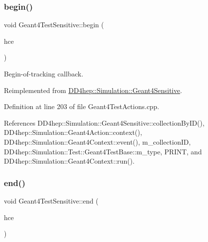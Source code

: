 \subsubsection{\texorpdfstring{begin()}{begin()}}
{\footnotesize\ttfamily void Geant4\+Test\+Sensitive\+::begin (\begin{DoxyParamCaption}\item[{G4\+H\+Cof\+This\+Event $\ast$}]{hce }\end{DoxyParamCaption})\hspace{0.3cm}{\ttfamily [virtual]}}



Begin-\/of-\/tracking callback. 



Reimplemented from \hyperlink{class_d_d4hep_1_1_simulation_1_1_geant4_sensitive_a2967b095e6c32ae82f68a8b25a086c86}{D\+D4hep\+::\+Simulation\+::\+Geant4\+Sensitive}.



Definition at line 203 of file Geant4\+Test\+Actions.\+cpp.



References D\+D4hep\+::\+Simulation\+::\+Geant4\+Sensitive\+::collection\+By\+I\+D(), D\+D4hep\+::\+Simulation\+::\+Geant4\+Action\+::context(), D\+D4hep\+::\+Simulation\+::\+Geant4\+Context\+::event(), m\+\_\+collection\+ID, D\+D4hep\+::\+Simulation\+::\+Test\+::\+Geant4\+Test\+Base\+::m\+\_\+type, P\+R\+I\+NT, and D\+D4hep\+::\+Simulation\+::\+Geant4\+Context\+::run().

\hypertarget{class_d_d4hep_1_1_simulation_1_1_test_1_1_geant4_test_sensitive_accc5a2ae9369d9847ac25a01b55e6350}{}\label{class_d_d4hep_1_1_simulation_1_1_test_1_1_geant4_test_sensitive_accc5a2ae9369d9847ac25a01b55e6350} 
\subsubsection{\texorpdfstring{end()}{end()}}
{\footnotesize\ttfamily void Geant4\+Test\+Sensitive\+::end (\begin{DoxyParamCaption}\item[{G4\+H\+Cof\+This\+Event $\ast$}]{hce }\end{DoxyParamCaption})\hspace{0.3cm}{\ttfamily [virtual]}}



